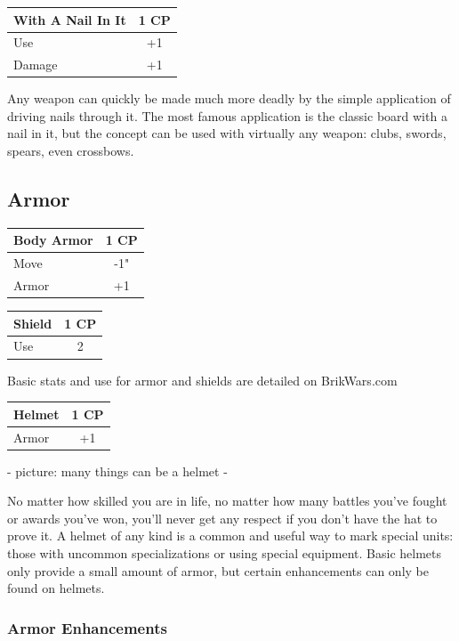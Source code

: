\documentclass[12pt,a4paper,twocolumn]{article}
\begin{document}
\begin{tabular}{|l|c|} \hline
With A Nail In It & 1 CP \\ \hline
Use & +1 \\ \hline
Damage & +1 \\ \hline
\end{tabular}

Any weapon can quickly be made much more deadly by the simple application of driving nails through it.  The most famous application is the classic board with a nail in it, but the concept can be used with virtually any weapon: clubs, swords, spears, even crossbows.

\subsection{Armor}

\begin{tabular}{|l|c|} \hline
Body Armor & 1 CP \\ \hline
Move & -1" \\ \hline
Armor & +1 \\ \hline
\end{tabular}

\begin{tabular}{|l|c|} \hline
Shield & 1 CP \\ \hline
Use & 2 \\ \hline
\end{tabular}

Basic stats and use for armor and shields are detailed on BrikWars.com

\begin{tabular}{|l|c|} \hline
Helmet & 1 CP \\ \hline
Armor & +1 \\ \hline
\end{tabular}

- picture: many things can be a helmet -

No matter how skilled you are in life, no matter how many battles you've fought or awards you've won, you'll never get any respect if you don't have the hat to  prove it.  A helmet of any kind is a common and useful way to mark special units: those with uncommon specializations or using special equipment.  Basic helmets only provide a small amount of armor, but certain enhancements can only be found on helmets.

\subsubsection{Armor Enhancements}
\end{document}
